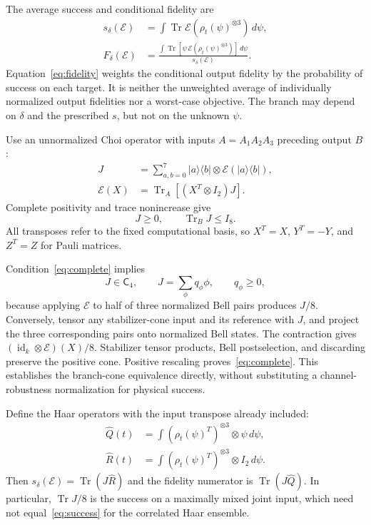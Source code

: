\documentclass[aps,pra,reprint,amsmath,amssymb,longbibliography,nofootinbib]{revtex4-2}
\newcommand{\Tr}{\operatorname{Tr}}
\newcommand{\id}{\operatorname{id}}
\newcommand{\cE}{\mathcal E}
\newcommand{\Qh}{\widehat Q}
\newcommand{\Rh}{\widehat R}
\newcommand{\Cs}{\mathsf C}
\begin{document}
The average success and conditional fidelity are
\begin{align}
 s_\delta(\cE)&=\int\Tr\cE(\rho_t(\psi)^{\otimes3})\,d\psi,
 \label{eq:success}\\
 F_\delta(\cE)&=
 \frac{\int\Tr[\psi\,\cE(\rho_t(\psi)^{\otimes3})]\,d\psi}
 {s_\delta(\cE)}.
 \label{eq:fidelity}
\end{align}
Equation~\eqref{eq:fidelity} weights the conditional output fidelity by the probability of success on each target. It is neither the unweighted average of individually normalized output fidelities nor a worst-case objective. The branch may depend on $\delta$ and the prescribed $s$, but not on the unknown $\psi$.

Use an unnormalized Choi operator with inputs $A=A_1A_2A_3$ preceding output $B$:
\begin{align}
 J&=\sum_{a,b=0}^7|a\rangle\langle b|\otimes\cE(|a\rangle\langle b|),
 \label{eq:choi}\\
 \cE(X)&=\Tr_A[(X^T\otimes I_2)J].
 \label{eq:choi-action}
\end{align}
Complete positivity and trace nonincrease give
\begin{equation}
 J\geq0,\qquad \Tr_B J\leq I_8.
 \label{eq:tni}
\end{equation}
All transposes refer to the fixed computational basis, so $X^T=X$, $Y^T=-Y$, and $Z^T=Z$ for Pauli matrices.

Condition~\eqref{eq:complete} implies
\begin{equation}
 J\in\Cs_4,\qquad J=\sum_\phi q_\phi\phi,\qquad q_\phi\geq0,
 \label{eq:cone}
\end{equation}
because applying $\cE$ to half of three normalized Bell pairs produces $J/8$. Conversely, tensor any stabilizer-cone input and its reference with $J$, and project the three corresponding pairs onto normalized Bell states. The contraction gives $(\id_k\otimes\cE)(X)/8$. Stabilizer tensor products, Bell postselection, and discarding preserve the positive cone. Positive rescaling proves~\eqref{eq:complete}. This establishes the branch-cone equivalence directly, without substituting a channel-robustness normalization for physical success.

Define the Haar operators with the input transpose already included:
\begin{align}
 \Qh(t)&=\int(\rho_t(\psi)^T)^{\otimes3}\otimes\psi\,d\psi,
 \label{eq:Q}\\
 \Rh(t)&=\int(\rho_t(\psi)^T)^{\otimes3}\otimes I_2\,d\psi.
 \label{eq:R}
\end{align}
Then $s_\delta(\cE)=\Tr(J\Rh)$ and the fidelity numerator is $\Tr(J\Qh)$. In particular, $\Tr J/8$ is the success on a maximally mixed joint input, which need not equal~\eqref{eq:success} for the correlated Haar ensemble.
\end{document}

